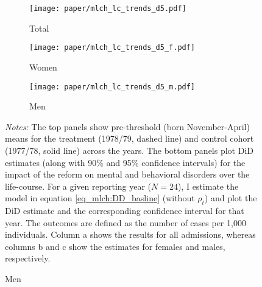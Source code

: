 \begin{landscape}
	\vspace*{\fill}
	\begin{figure}[H]\centering
		\caption{Life-course approach for \textbf{mental and behavioral disorders}}\label{fig_mlch: lc_d5_frg_DD}
		\begin{subfigure}[h]{0.31\linewidth}\centering\caption{Total}
			\texttt{[image: paper/mlch\_lc\_trends\_d5.pdf]}
		\end{subfigure}
		\begin{subfigure}[h]{0.31\linewidth}\centering\caption{Women}
			\texttt{[image: paper/mlch\_lc\_trends\_d5\_f.pdf]}
		\end{subfigure}
		\begin{subfigure}[h]{0.31\linewidth}\centering\caption{Men}
			\texttt{[image: paper/mlch\_lc\_trends\_d5\_m.pdf]}
		\end{subfigure}
		\scriptsize
		\begin{minipage}{\linewidth}
			\emph{Notes:} The top panels show pre-threshold (born November-April) means for the treatment (1978/79, dashed line) and control cohort (1977/78, solid line) across the years. The bottom panels plot DiD estimates (along with 90\% and 95\% confidence intervals) for the impact of the reform on mental and behavioral disorders over the life-course. For a given reporting year ($N=24$), I estimate the model in equation \ref{eq_mlch:DD_basline} (without $\rho_t$) and plot the DiD estimate and the corresponding confidence interval for that year. The outcomes are defined as the number of cases per 1,000 individuals. Column a shows the results for all admissions, whereas columns b and c show the estimates for females and males, respectively.
		\end{minipage}
	\end{figure}
	\vspace*{\fill}\clearpage
\end{landscape}
\restoregeometry



%

 


